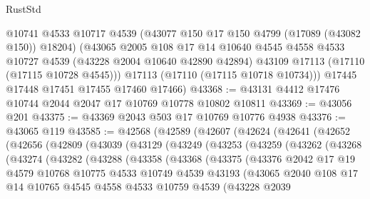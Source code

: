 \begin{lexlean}{RustStd}
\begin{coremodule}
        @10741
        @4533
        @10717
        @4539
        (@43077 @150 @17 @150 @4799 (@17089 (@43082 @150)) @18204)
        (@43065
          @2005
          @108
          @17
          @14
          @10640
          @4545
          @4558
          @4533
          @10727
          @4539
          (@43228 @2004 @10640 @42890 @42894)
          @43109
          @17113
          (@17110 (@17115 @10728 @4545)))
        @17113
        (@17110 (@17115 @10718 @10734)))
      @17445
      @17448
      @17451
      @17455
      @17460
      @17466)
@43368 := @43131 @4412 @17476 @10744 @2044 @2047 @17 @10769 @10778 @10802 @10811
@43369 := @43056 @201
@43375 := @43369 @2043 @503 @17 @10769 @10776 @4938
@43376 := @43065 @119
@43585 := @42568
    (@42589
      (@42607
        (@42624
          (@42641
            (@42652
              (@42656
                (@42809
                  (@43039
                    (@43129
                      (@43249
                        (@43253
                          (@43259
                            (@43262
                              (@43268
                                (@43274
                                  (@43282
                                    (@43288
                                      (@43358
                                        (@43368
                                          (@43375
                                            (@43376
                                              @2042
                                              @17
                                              @19
                                              @4579
                                              @10768
                                              @10775
                                              @4533
                                              @10749
                                              @4539
                                              @43193
                                              (@43065
                                                @2040
                                                @108
                                                @17
                                                @14
                                                @10765
                                                @4545
                                                @4558
                                                @4533
                                                @10759
                                                @4539
                                                (@43228
                                                  @2039

\end{coremodule}
\end{lexlean}
